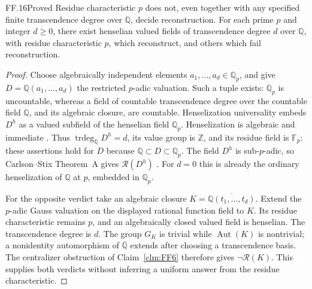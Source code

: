\begin{claim}{FF.16}{Proved}\label{clm:FFmixed}
Residue characteristic \(p\) does not, even together with any
specified finite transcendence degree over \(\mathbb Q\), decide
reconstruction. For each prime \(p\) and integer \(d\geq0\),
there exist henselian valued fields of transcendence degree \(d\)
over \(\mathbb Q\), with residue characteristic \(p\), which
reconstruct, and others which fail reconstruction.
\end{claim}
\begin{proof}
Choose algebraically independent elements
\(a_1,\ldots,a_d\in\mathbb Q_p\), and give
\(D=\mathbb Q(a_1,\ldots,a_d)\) the restricted \(p\)-adic
valuation. Such a tuple exists: \(\mathbb Q_p\) is uncountable,
whereas a field of countable transcendence degree over the
countable field \(\mathbb Q\), and its algebraic closure, are
countable. Henselization universality embeds \(D^h\) as a
valued subfield of the henselian field \(\mathbb Q_p\).
Henselization is algebraic and immediate
\citep[Proposition~3.3.25, Corollary~3.3.26]{FF_ADH2017}.
Thus \(\operatorname{trdeg}_{\mathbb Q}D^h=d\), its value
group is \(\mathbb Z\), and its residue field is
\(\mathbb F_p\): these assertions hold for \(D\) because
\(\mathbb Q\subset D\subset\mathbb Q_p\).
The field \(D^h\) is sub-\(p\)-adic, so Carlson--Stix
Theorem~A gives \(\mathcal R(D^h)\)
\citep[Theorem~A, Theorem~4.1]{FF_CS2026}.
For \(d=0\) this is already the ordinary henselization of
\(\mathbb Q\) at \(p\), embedded in \(\mathbb Q_p\).

For the opposite verdict take an algebraic closure
\(K=\overline{\mathbb Q(t_1,\ldots,t_d)}\).
Extend the \(p\)-adic Gauss valuation on the displayed rational
function field to \(K\). Its residue characteristic remains
\(p\), and an algebraically closed valued field is henselian.
The transcendence degree is \(d\). The group \(G_K\) is
trivial while \(\operatorname{Aut}(K)\) is nontrivial; a
nonidentity automorphism of \(\overline{\mathbb Q}\) extends
after choosing a transcendence basis. The centralizer obstruction
of Claim~\ref{clm:FF6} therefore gives \(\neg\mathcal R(K)\).
This supplies both verdicts without inferring a uniform answer
from the residue characteristic.
\end{proof}

